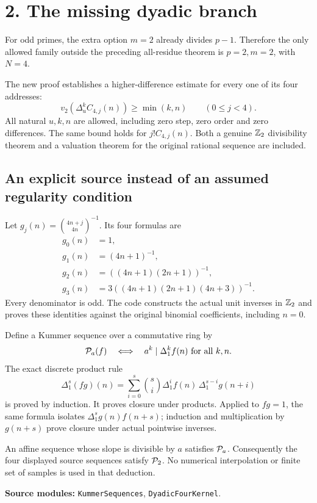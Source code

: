 \documentclass[11pt]{article}
\newcommand{\code}[1]{\texttt{\small #1}}
\begin{document}
\newpage
\section*{2. The missing dyadic branch}
For odd primes, the extra option $m=2$ already divides $p-1$. Therefore the only allowed family outside the preceding all-residue theorem is $p=2,m=2$, with $N=4$.

The new proof establishes a higher-difference estimate for every one of its four addresses:
\[
\boxed{v_2\!\left(\Delta_u^k C_{4,j}(n)\right)\ge\min(k,n)
       \qquad(0\le j<4).}
\]
All natural $u,k,n$ are allowed, including zero step, zero order and zero differences. The same bound holds for $j!C_{4,j}(n)$. Both a genuine $\mathbb Z_2$ divisibility theorem and a valuation theorem for the original rational sequence are included.

\subsection*{An explicit source instead of an assumed regularity condition}
Let $g_j(n)=\binom{4n+j}{4n}^{-1}$. Its four formulas are
\[
\begin{aligned}
 g_0(n)&=1,\\
 g_1(n)&=(4n+1)^{-1},\\
 g_2(n)&=((4n+1)(2n+1))^{-1},\\
 g_3(n)&=3((4n+1)(2n+1)(4n+3))^{-1}.
\end{aligned}
\]
Every denominator is odd. The code constructs the actual unit inverses in $\mathbb Z_2$ and proves these identities against the original binomial coefficients, including $n=0$.

Define a Kummer sequence over a commutative ring by
\[
\mathcal P_a(f)\quad\Longleftrightarrow\quad
 a^k\mid\Delta_1^k f(n)\ \text{for all }k,n.
\]
The exact discrete product rule
\[
\Delta_1^s(fg)(n)=\sum_{i=0}^s\binom si
     \Delta_1^i f(n)\,\Delta_1^{s-i}g(n+i)
\]
is proved by induction. It proves closure under products. Applied to $fg=1$, the same formula isolates
$\Delta_1^s g(n)f(n+s)$; induction and multiplication by $g(n+s)$ prove closure under actual pointwise inverses.

An affine sequence whose slope is divisible by $a$ satisfies $\mathcal P_a$. Consequently the four displayed source sequences satisfy $\mathcal P_2$. No numerical interpolation or finite set of samples is used in that deduction.

\textbf{Source modules:} \code{KummerSequences}, \code{DyadicFourKernel}.
\end{document}
